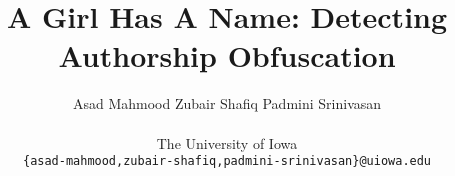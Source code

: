 \documentclass[11pt,a4paper]{article}
\title{A Girl Has A Name: Detecting Authorship Obfuscation}
\author{Asad Mahmood  \hspace{10mm} Zubair Shafiq  \hspace{10mm}  Padmini Srinivasan\\\\
The University of Iowa \\
  {\small \tt \{asad-mahmood,zubair-shafiq,padmini-srinivasan\}@uiowa.edu} }
\date{}
\begin{document}
\maketitle
\begin{abstract}
  
\end{abstract}





%







% 
\end{document}

